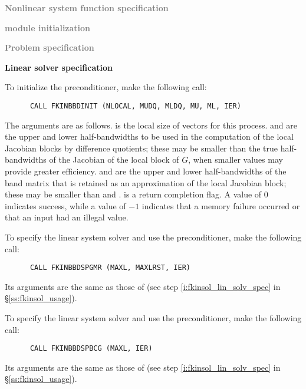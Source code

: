 \begin{Steps}
  
\item \textcolor{gray}{\bf Nonlinear system function specification}

\item \textcolor{gray}{\bf {\nvector} module initialization}

\item \textcolor{gray}{\bf Problem specification}

\item {\bf Linear solver specification}

  To initialize the {\kinbbdpre} preconditioner, make the following call:
\begin{verbatim}
      CALL FKINBBDINIT (NLOCAL, MUDQ, MLDQ, MU, ML, IER)
\end{verbatim}
  The arguments are as follows.
   is the local size of vectors for this process.
   and  are the upper and lower half-bandwidths to be used
  in the computation of the local Jacobian blocks by difference quotients;
  these may be smaller than the true half-bandwidths of the Jacobian of the
  local block of $G$, when smaller values may provide greater efficiency.
   and  are the upper and lower half-bandwidths of the band
  matrix that is retained as an approximation of the local Jacobian block;
  these may be smaller than  and .
   is a return completion flag.  A value of $0$ indicates success, while
  a value of $-1$ indicates that a memory failure occurred or that an input had
  an illegal value.

  To specify the {\spgmr} linear system solver and use the {\kinbbdpre}
  preconditioner, make the following call:
\begin{verbatim}
      CALL FKINBBDSPGMR (MAXL, MAXLRST, IER)
\end{verbatim}
  Its arguments are the same as those of 
  (see step \ref{i:fkinsol_lin_solv_spec} in \S\ref{ss:fkinsol_usage}).

  To specify the {\spbcg} linear system solver and use the {\kinbbdpre}
  preconditioner, make the following call:
\begin{verbatim}
      CALL FKINBBDSPBCG (MAXL, IER)
\end{verbatim}
  Its arguments are the same as those of 
  (see step \ref{i:fkinsol_lin_solv_spec} in \S\ref{ss:fkinsol_usage}).


\end{Steps}
